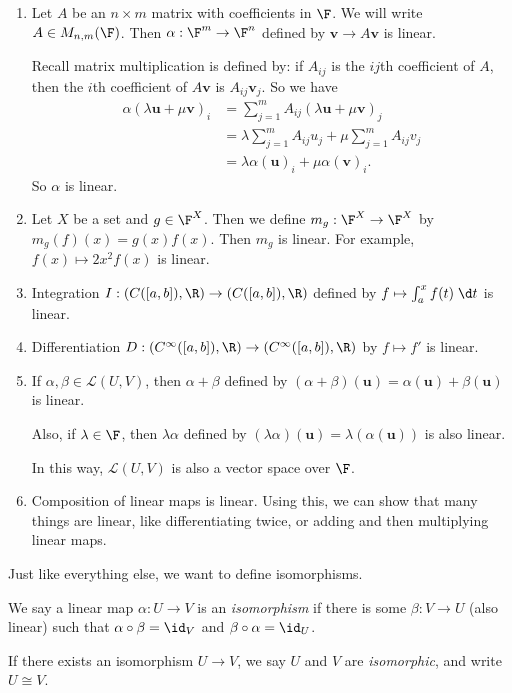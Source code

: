 \documentclass[a4paper]{article}
\begin{document}
\begin{eg}\leavevmode
  \begin{enumerate}
    \item Let $A$ be an $n\times m$ matrix with coefficients in $\F$. We will write $A\in M_{n, m}(\F)$. Then $\alpha: \F^m \to \F^n$ defined by $\mathbf{v}\to A\mathbf{v}$ is linear.

      Recall matrix multiplication is defined by: if $A_{ij}$ is the $ij$th coefficient of $A$, then the $i$th coefficient of $A\mathbf{v}$ is $A_{ij}\mathbf{v}_j$. So we have
      \begin{align*}
        \alpha(\lambda \mathbf{u} + \mu \mathbf{v})_i &= \sum_{j = 1}^m A_{ij}(\lambda \mathbf{u} + \mu \mathbf{v})_j \\
        &= \lambda \sum_{j = 1}^m A_{ij}u_j + \mu \sum_{j = 1}^m A_{ij} v_j \\
        &= \lambda \alpha(\mathbf{u})_i + \mu \alpha(\mathbf{v})_i.
      \end{align*}
      So $\alpha$ is linear.
    \item Let $X$ be a set and $g\in \F^X$. Then we define $m_g: \F^X \to \F^X$ by $m_g(f)(x) = g(x) f(x)$. Then $m_g$ is linear. For example, $f(x) \mapsto 2x^2 f(x)$ is linear.
    \item Integration $I: (C([a, b]), \R) \to (C([a, b]), \R)$ defined by $f\mapsto \int_a^x f(t) \;\d t$ is linear.
    \item Differentiation $D: (C^\infty ([a, b]), \R) \to (C^\infty ([a, b]), \R)$ by $ f\mapsto f'$ is linear.
    \item If $\alpha, \beta\in \mathcal{L}(U, V)$, then $\alpha + \beta$ defined by $(\alpha + \beta)(\mathbf{u}) = \alpha(\mathbf{u}) + \beta(\mathbf{u})$ is linear.

      Also, if $\lambda \in \F$, then $\lambda \alpha$ defined by $(\lambda \alpha)(\mathbf{u}) = \lambda (\alpha (\mathbf{u}))$ is also linear.

      In this way, $\mathcal{L}(U, V)$ is also a vector space over $\F$.
    \item Composition of linear maps is linear. Using this, we can show that many things are linear, like differentiating twice, or adding and then multiplying linear maps.
  \end{enumerate}
\end{eg}

Just like everything else, we want to define isomorphisms.
\begin{defi}[Isomorphism]
  We say a linear map $\alpha: U\to V$ is an \emph{isomorphism} if there is some $\beta: V\to U$ (also linear) such that $\alpha \circ \beta = \id_V$ and $\beta\circ \alpha = \id_U$.

  If there exists an isomorphism $U\to V$, we say $U$ and $V$ are \emph{isomorphic}, and write $U\cong V$.
\end{defi}
\end{document}
